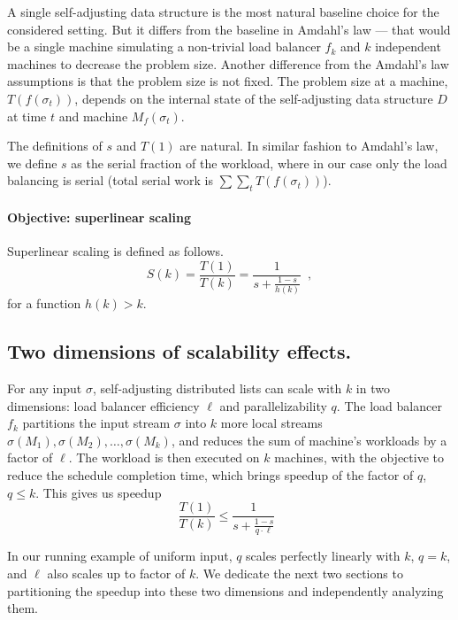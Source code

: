 A single self-adjusting data structure is the most natural baseline choice for the considered setting. But it differs from the baseline in Amdahl's law --- that would be a single machine simulating a non-trivial load balancer $f_k$ and $k$ independent machines to decrease the problem size. Another difference from the Amdahl's law assumptions is that the problem size is not fixed. The problem size at a machine, $T(f(\sigma_t))$, depends on the internal state of the self-adjusting data structure $D$ at time $t$ and machine $M_f(\sigma_t)$.



The definitions of $s$ and $T(1)$ are natural.
In similar fashion to Amdahl's law, we define $s$ as the serial fraction of the workload, where in our case only the load balancing is serial (total serial work is $\sum \sum_t T(f(\sigma_t))$).

\paragraph*{Objective: superlinear scaling}

Superlinear scaling is defined as follows.
  \begin{displaymath}
    S(k) = \frac{T(1)}{T(k)} = \frac{1}{s + \frac{1-s}{h(k)}} \enspace ,
  \end{displaymath}
for a function $h(k) > k$.



\subsection{Two dimensions of scalability effects.}

For any input $\sigma$, self-adjusting distributed lists can scale with $k$ in two dimensions: 
load balancer efficiency $\ell$ and parallelizability $q$.
The load balancer $f_k$ partitions the input stream $\sigma$ into $k$ more local streams $\sigma(M_1), \sigma(M_2), \ldots, \sigma(M_k)$, and reduces the sum of machine's workloads by a factor of $\ell$. The workload is then executed on $k$ machines, with the objective to reduce the schedule completion time, which brings speedup of the factor of $q$, $q\le k$.
This gives us speedup
\begin{equation*}\label{eq:mtf-perf}
  \frac{T(1)}{T(k)} \le \frac1{s + \frac{1-s}{q \cdot \ell}} \enspace 
\end{equation*}

In our running example of uniform input, $q$ scales perfectly linearly with $k$, $q=k$, and $\ell$ also scales up to factor of $k$. 
We dedicate the next two sections to partitioning the speedup into these two dimensions and independently analyzing them.


